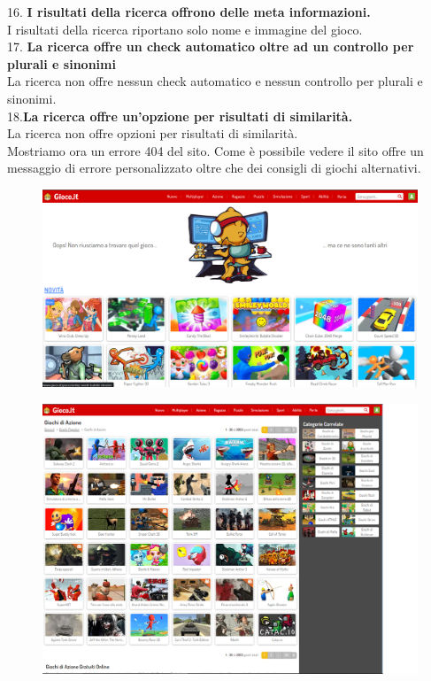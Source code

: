 \documentclass[../Report.tex]{subfiles}
\begin{document}
    16.\textbf{ I risultati della ricerca offrono delle meta informazioni.}\\
    I risultati della ricerca riportano solo nome e immagine del gioco.\\

    17. \textbf{La ricerca offre un check automatico oltre ad un controllo per plurali e sinonimi }\\
    La ricerca non offre nessun check automatico e nessun controllo per plurali e sinonimi.\\

    18.\textbf{La ricerca offre un’opzione per risultati di similarità.}\\
	La ricerca non offre opzioni per risultati di similarità.\\



    Mostriamo ora un errore 404 del sito. Come è possibile vedere il sito offre un messaggio di errore personalizzato oltre che dei consigli di giochi alternativi. 
    
    \begin{figure}[H]
        \includegraphics[width=\linewidth]{Assestment6.png}
        \centering
    \end{figure}



    \begin{figure}[H]
        \includegraphics[width=\linewidth]{Assestment7.png}
        \centering
    \end{figure}
    
\end{document}
